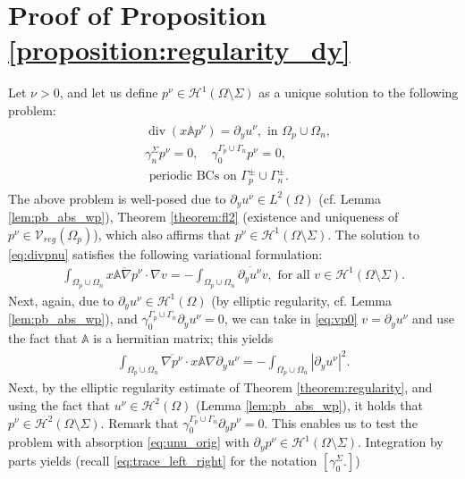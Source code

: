 \documentclass[report]{elsarticle}
\numberwithin{theorem}{section}
\begin{document}
\section{Proof of Proposition \ref{proposition:regularity_dy}}
\label{sec:prop_reg_dy}
Let $\nu>0$, and let us define $p^{\nu}\in \mathcal{H}^1(\Omega\setminus\Sigma)$ as a unique solution to the following  problem:
\begin{align}
	\label{eq:divpnu}
	\begin{split}
		&\operatorname{div}(x\mathbb{A}p^{\nu})=\partial_y u^{\nu}, \text{ in }\Omega_p\cup\Omega_n,\\
		&\gamma_{n}^{\Sigma}p^{\nu}=0,\quad
		\gamma_0^{\Gamma_p\cup\Gamma_n}p^{\nu}=0,\\
		&\text{ periodic BCs on }\Gamma^{\pm}_p\cup\Gamma^{\pm}_n.
	\end{split}
\end{align}
The above problem is well-posed due to $\partial_y u^{\nu}\in L^2(\Omega)$ (cf. Lemma \ref{lem:pb_abs_wp}), Theorem \ref{theorem:fl2} (existence and uniqueness of $p^{\nu}\in \mathcal{V}_{reg}(\Omega_p)$), which also affirms that $p^{\nu}\in \mathcal{H}^1(\Omega\setminus\Sigma)$. The solution to \eqref{eq:divpnu} satisfies the following variational formulation:
\begin{align}
	\label{eq:vp0}
	\int_{\Omega_p\cup\Omega_n}\overline{x\mathbb{A}\nabla p^{\nu}}\cdot \nabla v=-\int_{\Omega_p\cup\Omega_n}\overline{\partial_y u^{\nu}} v, \text{ for all }v\in \mathcal{H}^1(\Omega\setminus \Sigma). 
\end{align}
Next, again, due to $\partial_y u^{\nu}\in \mathcal{H}^1(\Omega)$ (by elliptic regularity, cf. Lemma \ref{lem:pb_abs_wp}), and $\gamma_0^{\Gamma_p\cup\Gamma_n}\partial_yu^{\nu}=0$,  we can take in \eqref{eq:vp0}  $v=\partial_y u^{\nu}$ and use the fact that $\mathbb{A}$ is a hermitian matrix; this yields 
\begin{align}
	\label{eq:vp}
	\int_{\Omega_p\cup\Omega_n}\overline{\nabla p^{\nu}}\cdot x\mathbb{A}\nabla \partial_y u^{\nu}=-\int_{\Omega_p\cup\Omega_n}|\partial_y u^{\nu}|^2.
\end{align}
Next, by the elliptic regularity estimate of Theorem \ref{theorem:regularity}, and using the fact that $u^{\nu}\in \mathcal{H}^2(\Omega)$ (Lemma \ref{lem:pb_abs_wp}), it holds that $p^{\nu}\in \mathcal{H}^2(\Omega\setminus\Sigma)$. Remark that $\gamma_0^{\Gamma_p\cup\Gamma_n}\partial_y p^{\nu}=0$.  
This enables us to test the problem with absorption \eqref{eq:unu_orig} with $\partial_y p^{\nu}\in \mathcal{H}^1(\Omega\setminus \Sigma)$. Integration by parts yields (recall \eqref{eq:trace_left_right} for the notation $[\gamma_0^{\Sigma}.]$)
\end{document}
